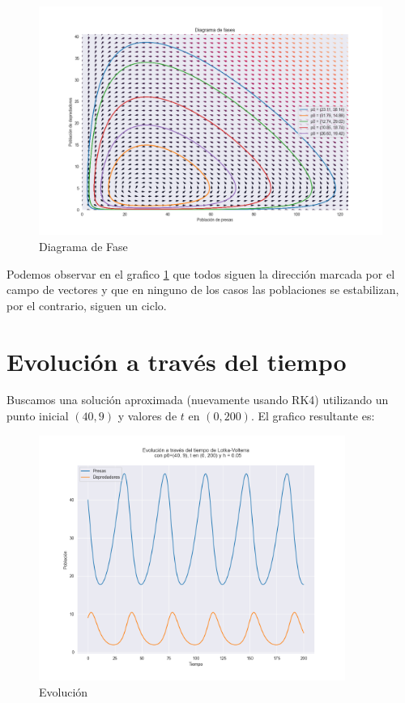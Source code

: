 \documentclass [a4paper,12pt,oneside,final]{article}
\begin{document}
\begin{figure}[H]
    \centering
    \includegraphics[width=12cm,keepaspectratio]{./diagramas/fases.png}
    \caption{Diagrama de Fase}\label{fig:fase}
\end{figure}

Podemos observar en el grafico \ref{fig:fase} que todos siguen la dirección marcada por el campo de vectores y que en ninguno de los casos las poblaciones se estabilizan, por el contrario, siguen un ciclo.


\section{Evolución a través del tiempo}

Buscamos una solución aproximada (nuevamente usando RK4) utilizando un punto inicial $(40, 9)$ y valores de $t$ en $(0, 200)$. El grafico resultante es:

\begin{figure}[H]
    \centering
    \includegraphics[width=10cm,keepaspectratio]{./diagramas/evolucion.png}
    \caption{Evolución}\label{fig:time}
\end{figure}
\end{document}
